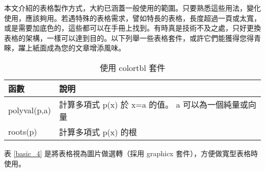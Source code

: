 本文介紹的表格製作方式，大約已涵蓋一般使用的範圍。只要熟悉這些用法，變化使用，應該夠用。若遇特殊的表格需求，譬如特長的表格，長度超過一頁或太寬，或是需要加底色的，這些都可以在手冊上找到。有時真是技術不及之處，只好更換表格的架構，一樣可以達到目的。以下列舉一些表格套件，或許它們能獲得您得青睞，躍上紙面成為您的文章增添風味。

\begin{table}[h]
\begin{center}
\caption{使用 {\A colortbl} 套件}\label{tab:b}
\extrarowheight=2pt
\begin{tabular}{ll}
\rowcolor[gray]{.9}
函數&說明\\
\toprule
{\C polyval(p,a)}	&	計算多項式 {\C p(x)} 於 {\C x=a} 的值。 {\C a } 可以為一個純量或向量\\
{\C roots(p)}		&	計算多項式 {\C p(x)} 的根\\
\bottomrule
\end{tabular}
\end{center}
\vspace{1cm}
\end{table}

\newpage
表 \ref{basic_4} 是將表格視為圖片做選轉（採用  {\A graphicx} 套件），方便做寬型表格時使用。
\begin{table}[h]
\begin{center}
\caption{旋轉表格}\label{basic_4}
\bigskip
\extrarowheight=2pt
\hspace{10pt}
\extrarowheight=2pt
\end{center}
\end{table}


